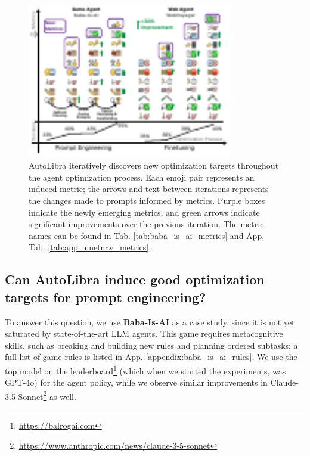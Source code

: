 \begin{figure}[!t]
	\centering
	\includegraphics[width=0.8\textwidth]{figs/autolibra-teaser.pdf}
	\caption{AutoLibra iteratively discovers new optimization targets throughout
	the agent optimization process. Each emoji pair represents an induced metric;
	the arrows and text between iterations represents the changes made to prompts
	informed by metrics. Purple boxes indicate the newly emerging metrics, and
	green arrows indicate significant improvements over the previous iteration. The
	metric names can be found in Tab. \ref{tab:baba_is_ai_metrics} and App. Tab.
	\ref{tab:app_nnetnav_metrics}. }
	\label{fig:autolibra-training}
	\vspace{-20pt}
\end{figure}

\subsection{Can AutoLibra induce good optimization targets for prompt
engineering?}
\label{sec:Baba-Is-AI}

To answer this question, we use \textbf{Baba-Is-AI} \citep{cloos2024babaaibreakrules, paglieri2024balrog}
as a case study, since it is not yet saturated by state-of-the-art LLM agents. This
game requires metacognitive skills, such as breaking and building new rules and
planning ordered subtasks; a full list of game rules is listed in App.
\ref{appendix:baba_is_ai_rules}. We use the top model on the leaderboard\footnote{\url{https://balrogai.com}}
(which when we started the experiments, was GPT-4o) \citep{openai2024gpt4ocard}
for the agent policy, while we observe similar improvements in Claude-3.5-Sonnet\footnote{\url{https://www.anthropic.com/news/claude-3-5-sonnet}}
as well.

